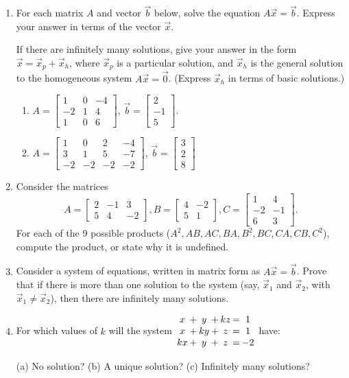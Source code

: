 \documentclass[12pt]{article}
\newcommand{\bbm}{\begin{bmatrix}}
\newcommand{\ebm}{\end{bmatrix}}
\begin{document}
 \begin{enumerate}
\item For each matrix $A$ and vector $\vec{b}$ below, solve the equation $A\vec{x}=\vec{b}$. Express your answer in terms of the vector $\vec{x}$.

If there are infinitely many solutions, give your answer in the form $\vec{x}=\vec{x}_p+\vec{x}_h$, where $\vec{x}_p$ is a particular solution, and $\vec{x}_h$ is the general solution to the homogeneous system $A\vec{x}=\vec{0}$. (Express $\vec{x}_h$ in terms of basic solutions.)
\begin{enumerate}
\item $A = \bbm 1&0&-4\\-2&1&4\\1&0&6\ebm$, $\vec{b}=\bbm 2\\-1\\5\ebm$.

\vspace{3in}

\item $A= \bbm 1&0&2&-4\\3&1&5&-7\\-2&-2&-2&-2\ebm$, $\vec{b}=\bbm 3\\2\\8\ebm$
\end{enumerate}

\newpage

\item Consider the matrices
\[
A = \bbm 2&-1&3\\5&4&-2\ebm, B = \bbm 4&-2\\5&1\ebm, C = \bbm 1&4\\-2&-1\\6&3\ebm.
\]
For each of the 9 possible products ($A^2, AB, AC, BA, B^2, BC, CA, CB, C^2$), compute the product, or state why it is undefined.

\newpage

\item Consider a system of equations, written in matrix form as $A\vec{x}=\vec{b}$. Prove that if there is more than one solution to the system (say, $\vec{x}_1$ and $\vec{x}_2$, with $\vec{x}_1\neq \vec{x}_2$), then there are infinitely many solutions.

\vspace{2.5in}

\item For which values of $k$ will the system \hspace{12pt}
$\arraycolsep1pt
\begin{array}{ccccccc}
x&+&y&+&kz&=&1\\
x&+&ky&+&z&=&1\\
kx&+&y&+&z&=&-2
\end{array}$
\hspace{12pt} have: 

(a) No solution? \hspace{12pt} (b) A unique solution? \hspace{12pt} (c) Infinitely many solutions?
 \end{enumerate}
 
\end{document}
